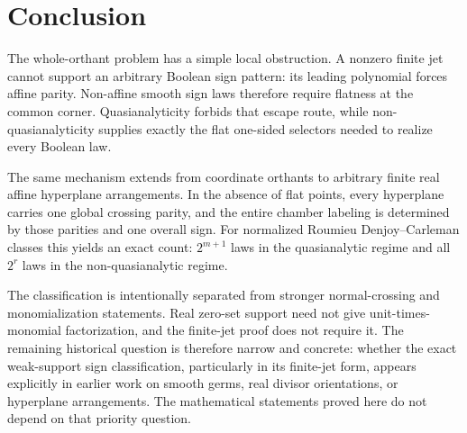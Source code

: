 \documentclass[11pt]{article}
\theoremstyle{definition}
\theoremstyle{remark}
\begin{document}
\section{Conclusion}

The whole-orthant problem has a simple local obstruction. A nonzero finite jet cannot support an arbitrary Boolean sign pattern: its leading polynomial forces affine parity. Non-affine smooth sign laws therefore require flatness at the common corner. Quasianalyticity forbids that escape route, while non-quasianalyticity supplies exactly the flat one-sided selectors needed to realize every Boolean law.

The same mechanism extends from coordinate orthants to arbitrary finite real affine hyperplane arrangements. In the absence of flat points, every hyperplane carries one global crossing parity, and the entire chamber labeling is determined by those parities and one overall sign. For normalized Roumieu Denjoy--Carleman classes this yields an exact count: $2^{m+1}$ laws in the quasianalytic regime and all $2^r$ laws in the non-quasianalytic regime.

The classification is intentionally separated from stronger normal-crossing and monomialization statements. Real zero-set support need not give unit-times-monomial factorization, and the finite-jet proof does not require it. The remaining historical question is therefore narrow and concrete: whether the exact weak-support sign classification, particularly in its finite-jet form, appears explicitly in earlier work on smooth germs, real divisor orientations, or hyperplane arrangements. The mathematical statements proved here do not depend on that priority question.
\end{document}

